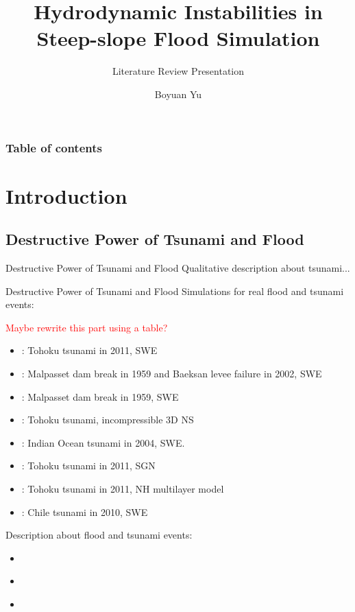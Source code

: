 \documentclass[USenglish, mathserif]{beamer}
\author{Boyuan Yu} %
\institute[MU] %
{\bigskip
\small{McGill University \\ %
\smallskip
Department of Civil Engineering and Applied Mechanics}}
\title{Hydrodynamic Instabilities in Steep-slope Flood Simulation}
\subtitle{Literature Review Presentation}
\def\red{\textcolor{red}}
\numberwithin{equation}{section}
\numberwithin{figure}{section}
\begin{document}

\begin{frame}[allowframebreaks]
    \frametitle{Table of contents}
		\setcounter{tocdepth}{2} 
        \tableofcontents 
\end{frame}

\section{Introduction}
\subsection{Destructive Power of Tsunami and Flood}
\begin{frame}{{\fontsize{16}{16}\selectfont Destructive Power of Tsunami and Flood}}
	Qualitative description about tsunami... \cite{LeVeque2011}
	
\end{frame}

\begin{frame}[allowframebreaks]{{\fontsize{16}{16}\selectfont Destructive Power of Tsunami and Flood}}
	Simulations for real flood and tsunami events: 
	
	\red{Maybe rewrite this part using a table?}
	
	\begin{itemize}
		\item \cite{Popinet2012_tohoku}: Tohoku tsunami in 2011, SWE
		\item \cite{An2015}: Malpasset dam break in 1959 and Baeksan levee failure in 2002, SWE
		\item \cite{George2011}: Malpasset dam break in 1959, SWE
		\item \cite{Oishi2013}: Tohoku tsunami, incompressible 3D NS
		\item \cite{Popinet2011}: Indian Ocean tsunami in 2004, SWE.
		\item \cite{Popinet2015}: Tohoku tsunami in 2011, SGN
		\item \cite{Popinet2020}: Tohoku tsunami in 2011, NH multilayer model
		\item \cite{LeVeque2011}: Chile tsunami in 2010, SWE
	\end{itemize}
    \framebreak
	Description about flood and tsunami events:
	\begin{itemize}
		\item \cite{Marras2020}
		\item \cite{Xie2019}
		\item 
	\end{itemize}
\end{frame}
\end{document}
